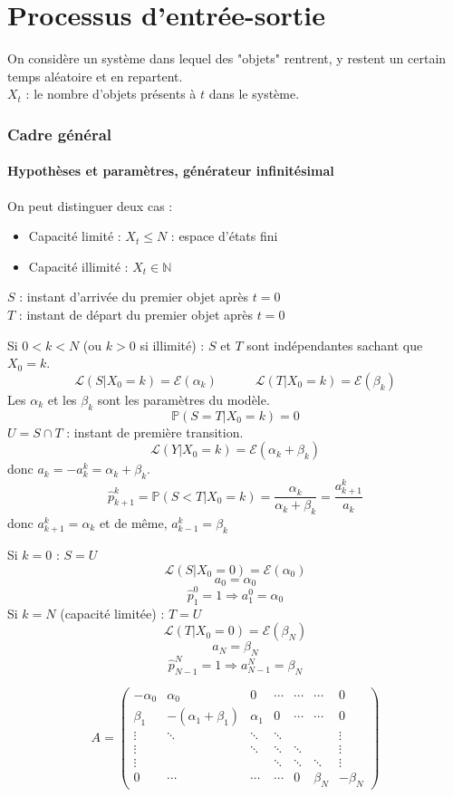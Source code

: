 \part{Processus d'entrée-sortie}
On considère un système dans lequel des "objets" rentrent, y restent un certain temps aléatoire et en repartent.\\
$X_t$ : le nombre d'objets présents à $t$ dans le système.

\section{Cadre général}
\subsection{Hypothèses et paramètres, générateur infinitésimal}
On peut distinguer deux cas :
\begin{itemize}
	\item Capacité limité : $X_t\leq N$ : espace d'états fini
	\item Capacité illimité : $X_t\in\mathbb{N}$
\end{itemize}

\bigskip
$S$ : instant d'arrivée du premier objet après $t=0$\\
$T$ : instant de départ du premier objet après $t=0$

\bigskip
Si $0<k<N$ (ou $k>0$ si illimité) : $S$ et $T$ sont indépendantes sachant que $X_0=k$.
	\[\mathcal{L}(S|X_0=k)=\mathcal{E}(\alpha_k) \hspace{3em} \mathcal{L}(T|X_0=k)=\mathcal{E}(\beta_k)\]
Les $\alpha_k$ et les $\beta_k$ sont les paramètres du modèle.
	\[\mathbb{P}(S=T|X_0=k)=0\]
$U=S\cap T$ : instant de première transition.
	\[\mathcal{L}(Y|X_0=k)=\mathcal{E}(\alpha_k+\beta_k)\]
donc $a_k=-a_k^k=\alpha_k+\beta_k$.
	\[\hat{p}^k_{k+1}=\mathbb{P}(S<T|X_0=k)=\frac{\alpha_k}{\alpha_k+\beta_k}=\frac{a^k_{k+1}}{a_k}\]
donc $a^k_{k+1}=\alpha_k$ et de même, $a^k_{k-1}=\beta_k$

\bigskip
Si $k=0$ : $S=U$
	\[\mathcal{L}(S|X_0=0)=\mathcal{E}(\alpha_0)\]
	\[a_0=\alpha_0\]
	\[\hat{p}_1^0=1\Rightarrow a_1^0=\alpha_0\]
Si $k=N$ (capacité limitée) : $T=U$
	\[\mathcal{L}(T|X_0=0)=\mathcal{E}(\beta_N)\]
	\[a_N=\beta_N\]
	\[\hat{p}_{N-1}^N=1\Rightarrow a_{N-1}^N=\beta_N\]

\[A=\begin{pmatrix}-\alpha_0 &      \alpha_0       &    0     & \cdots & \cdots & \cdots & 0 \\
		    \beta_1  & -(\alpha_1+\beta_1) & \alpha_1 &    0   & \cdots & \cdots & 0 \\
		     \vdots  &      \ddots         &  \ddots  & \ddots &        &        & \vdots \\
                    \vdots   &                     &  \ddots  & \ddots & \ddots &        & \vdots \\
		    \vdots   &                     &          & \ddots & \ddots & \ddots & \vdots \\
                       0     &       \cdots        &  \cdots  & \cdots &   0    &\beta_N & -\beta_N \end{pmatrix}\]

